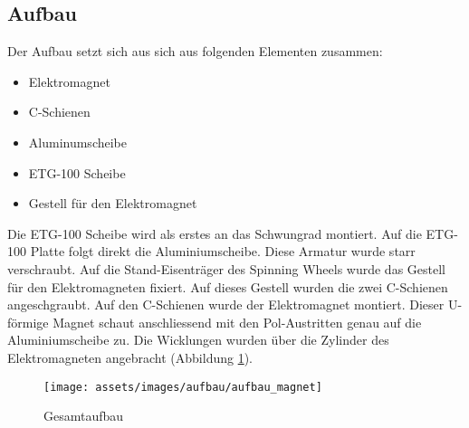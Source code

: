 \subsection{Aufbau} \label{cap:methoden_aufbau}


Der Aufbau setzt sich aus sich aus folgenden Elementen zusammen: 
\begin{itemize}
\item Elektromagnet		
\item C-Schienen	
\item Aluminumscheibe	
\item ETG-100 Scheibe
\item Gestell für den Elektromagnet
\end{itemize}

Die ETG-100 Scheibe wird als erstes an das Schwungrad montiert. Auf die ETG-100 Platte folgt direkt die Aluminiumscheibe. Diese Armatur wurde starr verschraubt. 
Auf die Stand-Eisenträger des Spinning Wheels wurde das Gestell für den Elektromagneten fixiert. Auf dieses Gestell wurden die zwei C-Schienen angeschgraubt. Auf den C-Schienen wurde der Elektromagnet montiert. Dieser U-förmige Magnet schaut anschliessend mit den Pol-Austritten genau auf die Aluminiumscheibe zu. Die Wicklungen wurden über die Zylinder des Elektromagneten angebracht (Abbildung \ref{fig:gesamtaufbau}).

\begin{figure}[ht]
  \begin{center}
    \texttt{[image: assets/images/aufbau/aufbau\_magnet]}
  \end{center}
  \vspace{-3ex}
  \caption{Gesamtaufbau}
  \label{fig:gesamtaufbau}
\end{figure}
